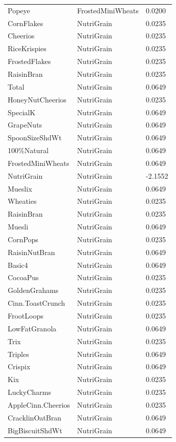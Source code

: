 \begin{table}[!htbp]
\begin{tabular}{lll}
\\
Popeye & FrostedMiniWheats & 0.0200
\\
CornFlakes & NutriGrain & 0.0235
\\
Cheerios & NutriGrain & 0.0235
\\
RiceKrispies & NutriGrain & 0.0235
\\
FrostedFlakes & NutriGrain & 0.0235
\\
RaisinBran & NutriGrain & 0.0235
\\
Total & NutriGrain & 0.0649
\\
HoneyNutCheerios & NutriGrain & 0.0235
\\
SpecialK & NutriGrain & 0.0649
\\
GrapeNuts & NutriGrain & 0.0649
\\
SpoonSizeShdWt & NutriGrain & 0.0649
\\
100\%Natural & NutriGrain & 0.0649
\\
FrostedMiniWheats & NutriGrain & 0.0649
\\
NutriGrain & NutriGrain & -2.1552
\\
Mueslix & NutriGrain & 0.0649
\\
Wheaties & NutriGrain & 0.0235
\\
RaisinBran & NutriGrain & 0.0235
\\
Muesli & NutriGrain & 0.0649
\\
CornPops & NutriGrain & 0.0235
\\
RaisinNutBran & NutriGrain & 0.0649
\\
Basic4 & NutriGrain & 0.0649
\\
CocoaPus & NutriGrain & 0.0235
\\
GoldenGrahams & NutriGrain & 0.0235
\\
Cinn.ToastCrunch & NutriGrain & 0.0235
\\
FrootLoops & NutriGrain & 0.0235
\\
LowFatGranola & NutriGrain & 0.0649
\\
Trix & NutriGrain & 0.0235
\\
Triples & NutriGrain & 0.0649
\\
Crispix & NutriGrain & 0.0649
\\
Kix & NutriGrain & 0.0235
\\
LuckyCharms & NutriGrain & 0.0235
\\
AppleCinn.Cheerios & NutriGrain & 0.0235
\\
CracklinOatBran & NutriGrain & 0.0649
\\
BigBiscuitShdWt & NutriGrain & 0.0649

\end{tabular}
\end{table}
